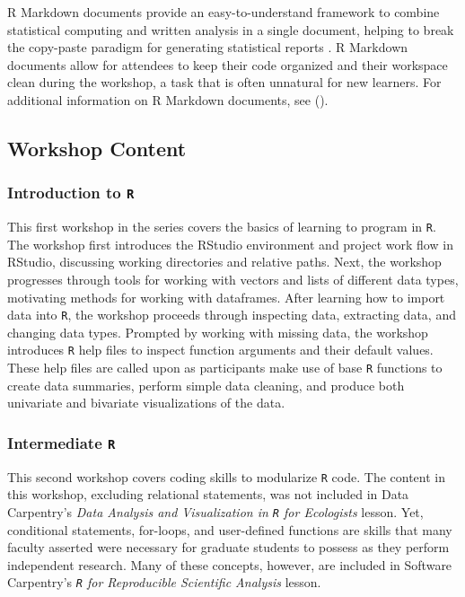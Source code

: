 \documentclass[12pt]{article}
\begin{document}
\noindent  R Markdown documents provide an easy-to-understand framework to combine
statistical computing and written analysis in a single document, helping to
break the copy-paste paradigm for generating statistical reports
\citep{mine-rmarkdown}. R Markdown documents allow for attendees to keep their
code organized and their workspace clean during the workshop, a task that is 
often unnatural for new learners. For additional
information on R Markdown documents, see \citeauthor{mine-rmarkdown} 
(\citeyear{mine-rmarkdown}). 




\subsection{Workshop Content}

\subsubsection{Introduction to \texttt{R}}
\label{sec:introR}

\noindent This first workshop in the series covers the basics of learning to
program in \texttt{R}. The workshop first introduces the RStudio environment and
project work flow in RStudio, discussing working directories and relative paths.
Next, the workshop progresses through tools for working with vectors and lists 
of different data types, motivating methods for working with dataframes. After
learning how to import data into \texttt{R}, the workshop proceeds through
inspecting data, extracting data, and changing data types. Prompted by working
with missing data, the workshop introduces \texttt{R} help files to inspect
function arguments and their default values. These help files are called upon
as participants make use of base \texttt{R} functions to create data summaries,
perform simple data cleaning, and produce both univariate and bivariate
visualizations of the data. 

\subsubsection{Intermediate \texttt{R}}
\label{sec:intermed}

\noindent This second workshop covers coding skills to modularize \texttt{R} code. 
The content in this workshop, excluding relational statements, was not
included in Data Carpentry's \emph{Data Analysis and Visualization in \texttt{R}
for Ecologists} lesson.
Yet, conditional statements, for-loops, and user-defined
functions are skills that many faculty asserted were necessary for graduate
students to possess as they perform independent research. Many of these
concepts, however, are included in Software Carpentry's 
\emph{\texttt{R} for Reproducible Scientific Analysis} lesson. 
\end{document}
